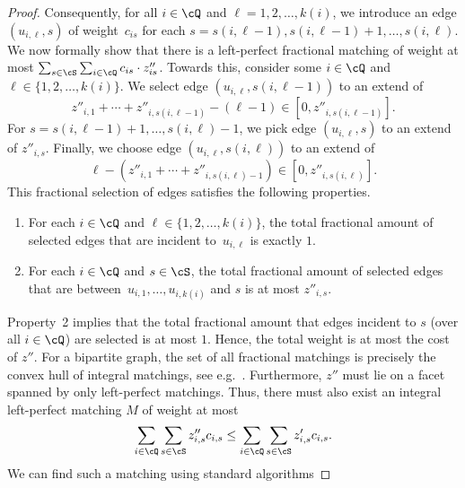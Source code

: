 \begin{proof}
    Consequently, for all $i\in\cQ$ and $\ell=1,2,\dotsc,k(i)$, we
    introduce an edge $(u_{i,\ell}, s)$ of weight~$c_{is}$ for
    each $s = s(i,\ell-1),s(i,\ell-1)+1,\dotsc,s(i,\ell)$.
    We now formally show that there is a left-perfect
    fractional matching
    of weight at most $\sum_{s\in\cS}\sum_{i\in\cQ}c_{is} \cdot z''_{is}$.
    Towards this,
    consider some $i\in \cQ$ and $\ell \in \{1,2,\dotsc,k(i)\}$.
    We select edge $(u_{i,\ell}, s(i, \ell-1))$ to an
    extend of
    \begin{equation*}
         z''_{i,1} + \cdots + z''_{i,s(i, \ell-1)} - (\ell - 1) \in [0, z''_{i,s(i, \ell-1)}].
    \end{equation*}
    For $s = s(i, \ell-1)+1,\dotsc,s(i, \ell)-1$, we pick edge $(u_{i,\ell}, s)$ to an extend of $z''_{i,s}$.
    Finally, we choose edge $(u_{i,\ell}, s(i, \ell))$ to an
    extend of
    \begin{equation*}
        \ell - (z''_{i,1} + \cdots + z''_{i,s(i, \ell)-1}) \in [0, z''_{i,s(i, \ell)}] .
    \end{equation*}
    This fractional selection of edges satisfies the following properties.
    \smallskip
    \begin{enumerate}
        \item For each $i\in\cQ$ and $\ell\in\{1,2,\dotsc,k(i)\}$, the total fractional amount of selected 
        edges that are incident to~$u_{i,\ell}$ 
        is exactly $1$.
        \item For each $i\in\cQ$ and $s\in\cS$,
        the total fractional amount of selected edges that are between~$u_{i,1},\dotsc,u_{i,k(i)}$ and $s$
        is at most $z''_{i,s}$.
    \end{enumerate}
    Property~2 implies that the total fractional amount that edges incident to $s$ (over all $i\in\cQ$) are selected is at most $1$.
    Hence, the total weight is
    at most the cost of $z''$.
    For a bipartite graph, the set of all fractional
    matchings is precisely the convex hull of integral
    matchings, see e.g.~\cite[Chapter~18]{schrijver2003combinatorial}. Furthermore, $z''$ must lie on a facet spanned by only left-perfect
    matchings.
    Thus, there must also
    exist an integral left-perfect matching $M$ of weight at most
    \begin{equation*}
        \sum_{i\in\cQ} \sum_{s\in\cS} z''_{i, s} c_{i, s}
        \le \sum_{i\in\cQ} \sum_{s\in\cS} z'_{i, s} c_{i, s} .
    \end{equation*}
    We can find such a matching using standard algorithms

\end{proof}
